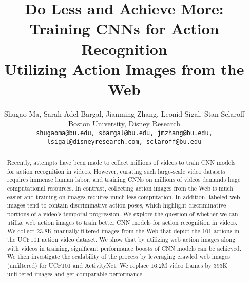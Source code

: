 \documentclass[10pt,twocolumn,letterpaper]{article}
\begin{document}
\title{Do Less and Achieve More: Training CNNs for Action Recognition \\ Utilizing Action Images from the Web}

\author{Shugao Ma,  Sarah Adel Bargal, Jianming Zhang, Leonid Sigal, Stan Sclaroff\\
Boston University, Disney Research\\
{\tt\small shugaoma@bu.edu, sbargal@bu.edu, jmzhang@bu.edu, lsigal@disneyresearch.com, sclaroff@bu.edu}
}

\makeatletter
\let\@oldmaketitle\@maketitle \renewcommand{\@maketitle}{\@oldmaketitle \texttt{[image: defPose.pdf]}
  \captionof{figure}{Sample action images from our dataset. Action images on the Web often capture well-framed descriminative poses of the actions they represent. Left to right: {\em Hammer Throw}, {\em Body Weight Squats}, {\em Jumping Jack}, {\em Basketball}, {\em Tai Chi}, {\em Cricket Shot}, {\em Lunges}, {\em Still Rings}. Utilizing web action images in training CNNs, for all these action classes, results in more than 10\% absolute increase in recognition accuracy in videos compared to CNNs trained only on video frames (see Fig.~\ref{fig:improvActions}).}
  \label{fig:defPose}
  \bigskip\bigskip}
\makeatother

\maketitle


\begin{abstract}
Recently, attempts have been made to collect millions of videos to train CNN models for action recognition in videos. However, curating such large-scale video datasets requires immense human labor, and training CNNs on millions of videos demands huge computational resources. In contrast, collecting action images from the Web is much easier and training on images requires much less computation. In addition, labeled web images tend to contain discriminative action poses, which highlight discriminative portions of a video's temporal progression. We explore the question of whether we can utilize web action images to train better CNN models for action recognition in videos. We collect 23.8K manually filtered images from the Web that depict the 101 actions in the UCF101 action video dataset. We show that by utilizing web action images along with videos in training, significant performance boosts of CNN models can be achieved. We then investigate the scalability of the process by leveraging crawled web images (unfiltered) for UCF101 and ActivityNet. We
replace 16.2M video frames by 393K unfiltered images and get comparable performance.

\end{abstract}
\end{document}
